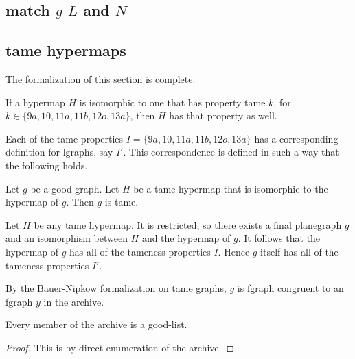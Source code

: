 

\subsection{match $g$ $L$ and $N$}

\subsection{tame hypermaps}

The formalization of this section is complete.

\begin{lemma} 
If a hypermap $H$ is isomorphic to one that has property
tame $k$, for $k\in \{9a, 10, 11a, 11b, 12o, 13a\}$, then
$H$ has that property as well.
\end{lemma} 

Each of the tame properties $I=\{9a,10,11a,11b,12o,13a\}$ has
a corresponding definition for lgraphs, say $I'$.  This correspondence is
defined in such a way that the following holds.

\begin{lemma}  Let $g$ be a good graph.  
Let $H$ be a tame hypermap that is isomorphic to the hypermap of $g$.
Then $g$ is tame.
\end{lemma} 

Let $H$ be any tame hypermap.  It is restricted, so there exists
a final planegraph $g$ and an isomorphism between $H$ and the
hypermap of $g$.  It follows that the hypermap of $g$ has all of
the tameness properties $I$.  Hence $g$ itself has all of the tameness
properties $I'$.  

By the Bauer-Nipkow formalization on tame graphs, $g$ is 
fgraph congruent
to an fgraph $y$ in the archive.

\begin{lemma}
 Every member of the archive 
is a good-list.
\end{lemma} 

\begin{proof} This is by direct enumeration of the archive.
\end{proof}

